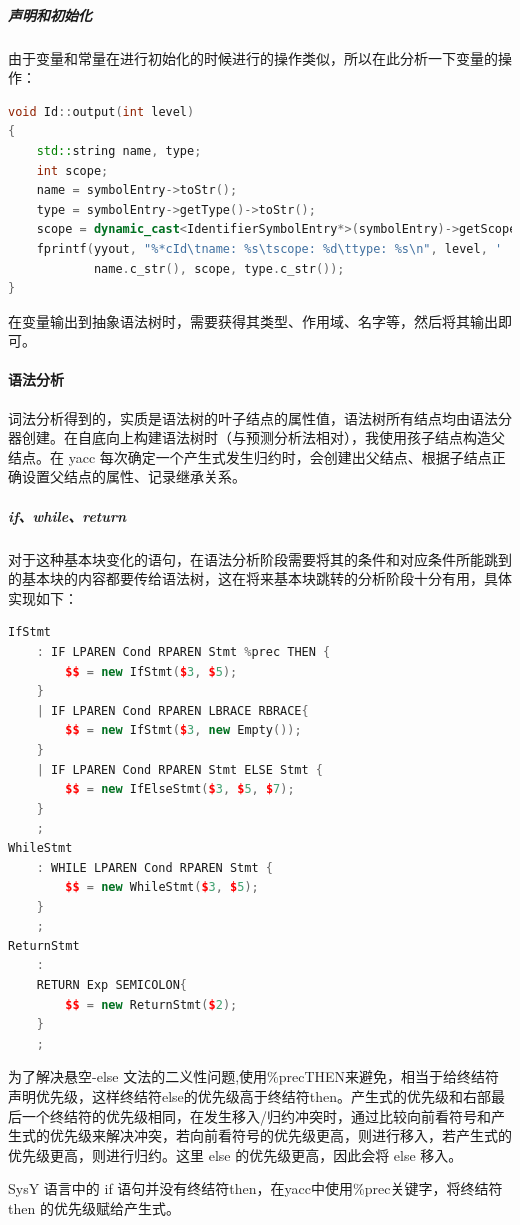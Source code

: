 \documentclass[UTF8,a4paper,10pt]{ctexart}
\begin{document}
\subparagraph{声明和初始化}
由于变量和常量在进行初始化的时候进行的操作类似，所以在此分析一下变量的操作：
\begin{lstlisting}[title = 声明和初始化, language = c++]
void Id::output(int level)
{
    std::string name, type;
    int scope;
    name = symbolEntry->toStr();
    type = symbolEntry->getType()->toStr();
    scope = dynamic_cast<IdentifierSymbolEntry*>(symbolEntry)->getScope();
    fprintf(yyout, "%*cId\tname: %s\tscope: %d\ttype: %s\n", level, ' ',
            name.c_str(), scope, type.c_str());
}
\end{lstlisting}
在变量输出到抽象语法树时，需要获得其类型、作用域、名字等，然后将其输出即可。

\paragraph{语法分析}
词法分析得到的，实质是语法树的叶子结点的属性值，语法树所有结点均由语法分器创建。在自底向上构建语法树时（与预测分析法相对），我使用孩子结点构造父结点。在 yacc 每次确定一个产生式发生归约时，会创建出父结点、根据子结点正确设置父结点的属性、记录继承关系。

\subparagraph{if、while、return}
对于这种基本块变化的语句，在语法分析阶段需要将其的条件和对应条件所能跳到的基本块的内容都要传给语法树，这在将来基本块跳转的分析阶段十分有用，具体实现如下：
\begin{lstlisting}[title = if、while、return, language = c++]
IfStmt
    : IF LPAREN Cond RPAREN Stmt %prec THEN {
        $$ = new IfStmt($3, $5);
    }
    | IF LPAREN Cond RPAREN LBRACE RBRACE{
        $$ = new IfStmt($3, new Empty());
    } 
    | IF LPAREN Cond RPAREN Stmt ELSE Stmt {
        $$ = new IfElseStmt($3, $5, $7);
    }
    ;
WhileStmt
    : WHILE LPAREN Cond RPAREN Stmt {
        $$ = new WhileStmt($3, $5);
    }
    ;
ReturnStmt
    :
    RETURN Exp SEMICOLON{
        $$ = new ReturnStmt($2);
    }
    ;
\end{lstlisting}
为了解决悬空-else 文法的二义性问题,使用\%precTHEN来避免，相当于给终结符声明优先级，这样终结符else的优先级高于终结符then。产生式的优先级和右部最后一个终结符的优先级相同，在发生移入/归约冲突时，通过比较向前看符号和产生式的优先级来解决冲突，若向前看符号的优先级更高，则进行移入，若产生式的优先级更高，则进行归约。这里 else 的优先级更高，因此会将 else 移入。

SysY 语言中的 if 语句并没有终结符then，在yacc中使用\%prec关键字，将终结符then 的优先级赋给产生式。
\end{document}
